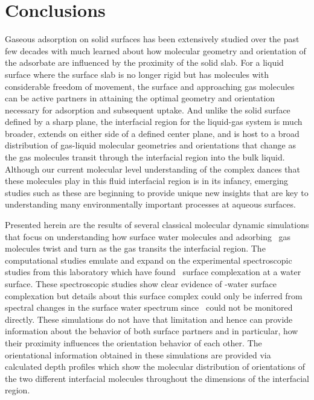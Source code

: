 \section {Conclusions}

Gaseous adsorption on solid surfaces has been extensively studied over the past few decades with much learned about how molecular geometry and orientation of the adsorbate are influenced by the proximity of the solid slab.  For a liquid surface where the surface slab is no longer rigid but has molecules with considerable freedom of movement, the surface and approaching gas molecules can be active partners in attaining the optimal geometry and orientation necessary for adsorption and subsequent uptake.    And unlike the solid surface defined by a sharp plane, the interfacial region for the liquid-gas system is much broader, extends on either side of a defined center plane, and is host to a broad distribution of gas-liquid molecular geometries and orientations that change as the gas molecules transit through the interfacial region into the bulk liquid.  Although  our current molecular level understanding of  the complex dances that these molecules play in this fluid interfacial region is in its infancy, emerging studies such as these are beginning to provide unique new insights that are key to understanding many  environmentally important processes at aqueous surfaces.

Presented herein are the results of several classical molecular dynamic simulations that focus on understanding how surface water molecules and adsorbing \suldiox~gas molecules twist and turn as the gas transits the interfacial region. The computational studies emulate and expand on the experimental spectroscopic studies from this laboratory which have found \suldiox~surface complexation at a water surface.\cite{Tarbuck2005,Tarbuck2006,Ota2011}  These spectroscopic studies show clear evidence of \suldiox-water surface complexation but details about this surface complex could only be inferred from spectral changes in the surface water spectrum since \suldiox~could not be monitored directly.   These simulations do not have that limitation and hence can provide information about the behavior of both surface partners and in particular, how their proximity influences the orientation behavior of each other.  The orientational information obtained in these simulations are provided via calculated depth profiles which show the molecular distribution of orientations of the two different interfacial molecules throughout the dimensions of the interfacial region.

